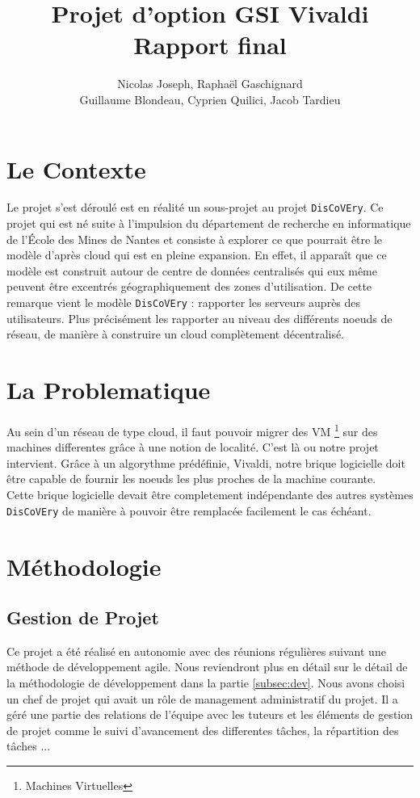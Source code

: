 \documentclass[11pt,a4paper]{article}
\title{Projet d'option GSI Vivaldi \\ Rapport final}
\author{Nicolas Joseph, Raphaël Gaschignard\\ Guillaume Blondeau, Cyprien Quilici, Jacob Tardieu}
\begin{document}
\maketitle
\section{Le Contexte}

Le projet s'est déroulé est en réalité un sous-projet au projet \texttt{DisCoVEry}. Ce projet qui est né suite à l’impulsion du département de recherche en informatique de l'École des Mines de Nantes et consiste à explorer ce que pourrait être le modèle d’après cloud qui est en pleine expansion. En effet, il apparaît que ce modèle est construit autour de centre de données centralisés qui eux même peuvent être excentrés géographiquement des zones d’utilisation. De cette remarque vient  le modèle \texttt{DisCoVEry} : rapporter les serveurs auprès des utilisateurs. Plus précisément les rapporter au niveau des différents noeuds de réseau, de manière à construire un cloud complètement décentralisé.

\section{La Problematique}
Au sein d'un réseau de type cloud, il faut pouvoir migrer des VM \footnote{Machines Virtuelles} sur des machines differentes grâce à une notion de localité. C'est là ou notre projet intervient. Grâce à un algorythme prédéfinie, Vivaldi, notre brique logicielle doit être capable de fournir les noeuds les plus proches de la machine courante.\\

Cette brique logicielle devait être completement indépendante des autres systèmes \texttt{DisCoVEry} de manière à pouvoir être remplacée facilement le cas échéant.

\section{Méthodologie}
\subsection{Gestion de Projet}
Ce projet a été réalisé en autonomie avec des réunions régulières suivant une méthode de développement agile. Nous reviendront plus en détail sur le détail de la méthodologie de développement dans la partie \ref{subsec:dev}. Nous avons choisi un chef de projet qui avait un rôle de management administratif du projet. Il a géré une partie des relations de l'équipe avec les tuteurs et les éléments de gestion de projet comme le suivi d'avancement des differentes tâches, la répartition des tâches ...\\
\end{document}
